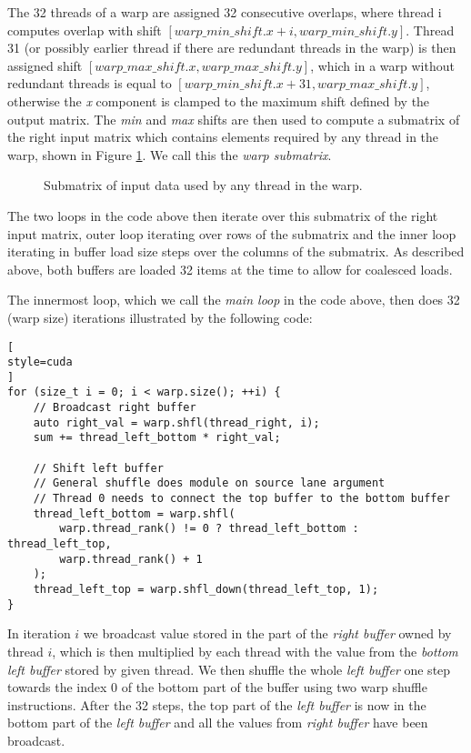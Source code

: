 The 32 threads of a warp are assigned 32 consecutive overlaps, where thread i computes overlap with shift $[warp\_min\_shift.x + i, warp\_min\_shift.y]$. Thread 31 (or possibly earlier thread if there are redundant threads in the warp) is then assigned shift $[warp\_max\_shift.x, warp\_max\_shift.y]$, which in a warp without redundant threads is equal to $[warp\_min\_shift.x + 31, warp\_max\_shift.y]$, otherwise the \textit{x} component is clamped to the maximum shift defined by the output matrix. The \textit{min} and \textit{max} shifts are then used to compute a submatrix of the right input matrix which contains elements required by any thread in the warp, shown in Figure \ref{fig:common_submatrix}. We call this the \textit{warp submatrix}.

\begin{figure}[ht]
	\centering
	\def\svgwidth{0.5\textwidth}
	
	\caption{Submatrix of input data used by any thread in the warp.}
	\label{fig:common_submatrix}
\end{figure}

The two loops in the code above then iterate over this submatrix of the right input matrix, outer loop iterating over rows of the submatrix and the inner loop iterating in buffer load size steps over the columns of the submatrix. As described above, both buffers are loaded 32 items at the time to allow for coalesced loads.


The innermost loop, which we call the \textit{main loop} in the code above, then does 32 (warp size) iterations illustrated by the following code:

\begin{lstlisting}[
style=cuda
]
for (size_t i = 0; i < warp.size(); ++i) {
	// Broadcast right buffer
	auto right_val = warp.shfl(thread_right, i);
	sum += thread_left_bottom * right_val;

	// Shift left buffer
	// General shuffle does module on source lane argument
	// Thread 0 needs to connect the top buffer to the bottom buffer
	thread_left_bottom = warp.shfl(
		warp.thread_rank() != 0 ? thread_left_bottom : thread_left_top,
		warp.thread_rank() + 1
	);
	thread_left_top = warp.shfl_down(thread_left_top, 1);
}
\end{lstlisting}

In iteration $i$ we broadcast value stored in the part of the \textit{right buffer} owned by thread $i$, which is then multiplied by each thread with the value from the \textit{bottom left buffer} stored by given thread. We then shuffle the whole \textit{left buffer} one step towards the index 0 of the bottom part of the buffer using two warp shuffle instructions. After the 32 steps, the top part of the \textit{left buffer} is now in the bottom part of the \textit{left buffer} and all the values from \textit{right buffer} have been broadcast. 

